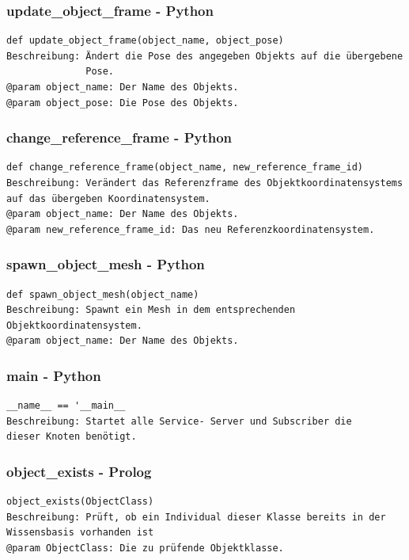 \documentclass{suturo}
\begin{document}
\subsubsection{update\_object\_frame - Python}
\begin{verbatim}
def update_object_frame(object_name, object_pose)
Beschreibung: Ändert die Pose des angegeben Objekts auf die übergebene
              Pose.
@param object_name: Der Name des Objekts.
@param object_pose: Die Pose des Objekts.
\end{verbatim}

\subsubsection{change\_reference\_frame - Python}
\begin{verbatim}
def change_reference_frame(object_name, new_reference_frame_id)
Beschreibung: Verändert das Referenzframe des Objektkoordinatensystems 
auf das übergeben Koordinatensystem.
@param object_name: Der Name des Objekts.
@param new_reference_frame_id: Das neu Referenzkoordinatensystem.
\end{verbatim}

\subsubsection{spawn\_object\_mesh - Python}
\begin{verbatim}
def spawn_object_mesh(object_name)
Beschreibung: Spawnt ein Mesh in dem entsprechenden Objektkoordinatensystem.
@param object_name: Der Name des Objekts.
\end{verbatim}

\subsubsection{main - Python}
\begin{verbatim}
__name__ == '__main__
Beschreibung: Startet alle Service- Server und Subscriber die
dieser Knoten benötigt.
\end{verbatim}

\subsubsection{object\_exists - Prolog}
\begin{verbatim}
object_exists(ObjectClass)
Beschreibung: Prüft, ob ein Individual dieser Klasse bereits in der
Wissensbasis vorhanden ist
@param ObjectClass: Die zu prüfende Objektklasse.
\end{verbatim}
\end{document}

